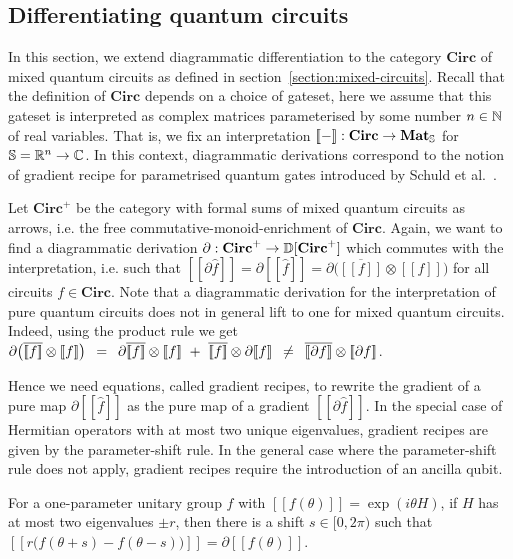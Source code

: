 
\subsection{Differentiating quantum circuits}\label{3-dual-circuits}

In this section, we extend diagrammatic differentiation to the category $\mathbf{Circ}$ of mixed quantum circuits as defined in section~\ref{section:mixed-circuits}.
Recall that the definition of $\mathbf{Circ}$ depends on a choice of gateset, here we assume that this gateset is interpreted as complex matrices parameterised by some number $n \in \N$ of real variables.
That is, we fix an interpretation $[\![-]\!] : \mathbf{Circ} \to \mathbf{Mat}_\S$ for $\S = \R^n \to \C$.
In this context, diagrammatic derivations correspond to the notion of gradient
recipe for parametrised quantum gates introduced by Schuld et al.~\cite{SchuldEtAl19}.

Let $\mathbf{Circ}^+$ be the category with formal sums of mixed quantum circuits as arrows, i.e. the free commutative-monoid-enrichment of $\mathbf{Circ}$.
Again, we want to find a diagrammatic derivation
$\partial : \mathbf{Circ}^+ \to \D[\mathbf{Circ}^+]$
which commutes with the interpretation, i.e. such that
$[\![\partial \hat{f}]\!] = \partial [\![\hat{f}]\!] =
\partial \big( \overline{[\![f]\!]} \otimes [\![f]\!] \big)$
for all circuits $f \in \mathbf{Circ}$.
Note that a diagrammatic derivation for the interpretation of pure quantum circuits does not in general lift to one for mixed quantum circuits.
Indeed, using the product rule we get
$\partial \big( \overline{[\![f]\!]} \otimes [\![f]\!] \big)
\s = \s \partial \overline{[\![f]\!]} \otimes [\![f]\!]
\ + \ \overline{[\![f]\!]} \otimes \partial [\![f]\!]
\s \neq \s \overline{[\![\partial f]\!]} \otimes [\![\partial f]\!]$.

Hence we need equations, called gradient recipes, to rewrite the gradient of a
pure map $\partial [\![\hat{f}]\!]$ as the pure map of a gradient
$[\![\partial \hat{f}]\!]$.
In the special case of Hermitian operators with at most two unique eigenvalues,
gradient recipes are given by the parameter-shift rule. In the general case
where the parameter-shift rule does not apply, gradient recipes require the
introduction of an ancilla qubit.

\begin{theorem}
For a one-parameter unitary group $f$ with
$[\![f(\theta)]\!] = \exp (i \theta H)$, if $H$ has at most two eigenvalues
$\pm r$, then there is a shift $s \in [0, 2 \pi)$ such that
$[\![r\big(f(\theta + s) - f(\theta - s)\big)]\!] = \partial [\![f(\theta)]\!]$.
\end{theorem}

